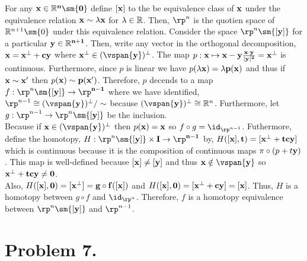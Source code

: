\documentclass[12pt]{extarticle}
\begin{document}
For any $\bf{x} \in \R^n \sm \{0\}$ define $[\bf{x}]$ to the be equivalence class of $\bf{x}$ under the equivalence relation $\bf{x} \sim \lambda \bf{x}$ for $\lambda \in \mathbb{R}$. Then, $\rp^{n}$ is the quotien space of $\R^{n + 1} \sm \{0\}$ under this equivalence relation. Consider the space $\rp^{n} \sm {[\bf{y}]}$ for a particular $\bf{y} \in \mathbb{R}^{n + 1}$. Then, write any vector in the orthogonal decomposition, $\bf{x} = \bf{x}^\perp + c \bf{y}$ where $\bf{x}^\perp \in (\vspan{\bf{y}})^\perp$. The map $p : \bf{x} \mapsto \bf{x} - \bf{y} \frac{\bf{x} \cdot \bf{y}}{|\bf{y}|^2} = \bf{x}^\perp$ is continuous. Furthermore, since $p$ is linear we have $p(\lambda \bf{x}) = \lambda p(\bf{x})$ and thus if $\bf{x} \sim \bf{x'}$ then $p(\bf{x}) \sim p(\bf{x'})$. Therefore, $p$ decends to a map $f : \rp^{n} \sm \{[\bf{y}]\} \to \rp^{n - 1}$ where we have identified, $\rp^{n-1} \cong (\vspan{\bf{y}})^\perp / \sim$ because $(\vspan{\bf{y}})^\perp \cong \R^{n}$.
Furthermore, let $g  : \rp^{n - 1} \to \rp^{n} \sm \{[\bf{y}]\}$ be the inclusion. \bigskip \\
Because if $\bf{x} \in (\vspan{\bf{y}})^\perp$ then $p(\bf{x}) = \bf{x}$ so $f \circ g = \id_{\rp^{n - 1}}$. Futhermore, define the homotopy, $H : \rp^n \sm \{[\bf{y}]\} \times I \to \rp^{n - 1}$ by, $H([\bf{x}], t) = [\bf{x}^\perp + tc \bf{y}]$ which is continuous because it is the composition of continuous maps $\pi \circ (p + t \bf{y})$. This map is well-defined because $[\bf{x}] \neq [\bf{y}]$ and thus $\bf{x} \notin \vspan{\bf{y}}$ so $\bf{x}^\perp + tc \bf{y} \neq 0$. \bigskip \\
Also, $H([\bf{x}], 0) = [\bf{x}^\perp] = g \circ f([\bf{x}])$ and $H([\bf{x}], 0) = [\bf{x}^\perp + c \bf{y}] = [\bf{x}]$. Thus, $H$ is a homotopy between $g \circ f$ and $\id_{\rp^{n}}$. Therefore, $f$ is a homotopy equivalence between $\rp^{n} \sm \{[\bf{y}]\}$ and $\rp^{n-1}$.  

\section*{Problem 7.}
\end{document}
